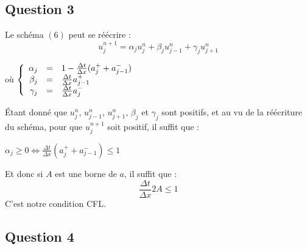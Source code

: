 \documentclass[a4paper,12pt]{article}
\begin{document}
\subsection{Question 3}

Le sch\'ema $(6)$ peut se r\'e\'ecrire :\\
\[u_{j}^{n+1}=\alpha_j u_{j}^{n}+\beta_j u_{j-1}^{n}+\gamma_j u_{j+1}^{n}\]
\begin{center}
  o\`u $\left\{
	\begin{array}{r c l}
	\alpha_j&=&1-\frac{\Delta t}{\Delta x}(a_{j}^{+}+a_{j-1}^{-})\\
	\beta_j&=&\frac{\Delta t}{\Delta x}a_{j-1}^{+}\\
	\gamma_j&=&\frac{\Delta t}{\Delta x}a_{j}^{-}
	\end{array}
	\right.
	$
\end{center}
\'Etant donn\'e que $u_{j}^{n}$, $u_{j-1}^{n}$, $u_{j+1}^{n}$, $\beta_j$ et $\gamma_j$ sont positifs, et au vu de la r\'e\'ecriture du sch\'ema, pour que $u_{j}^{n+1}$ soit positif, il suffit que :
\begin{center}
  $\alpha_j \geq 0
	\iff \frac{\Delta t}{\Delta x}(a_{j}^{+}+a_{j-1}^{-}) \leq 1$
\end{center}
Et donc si $A$ est une borne de $a$, il suffit que :
\begin{equation}
  \frac{\Delta t}{\Delta x}2A \leq 1
	\label{eq_7}
\end{equation}
C'est notre condition CFL.

\subsection{Question 4}
\end{document}
